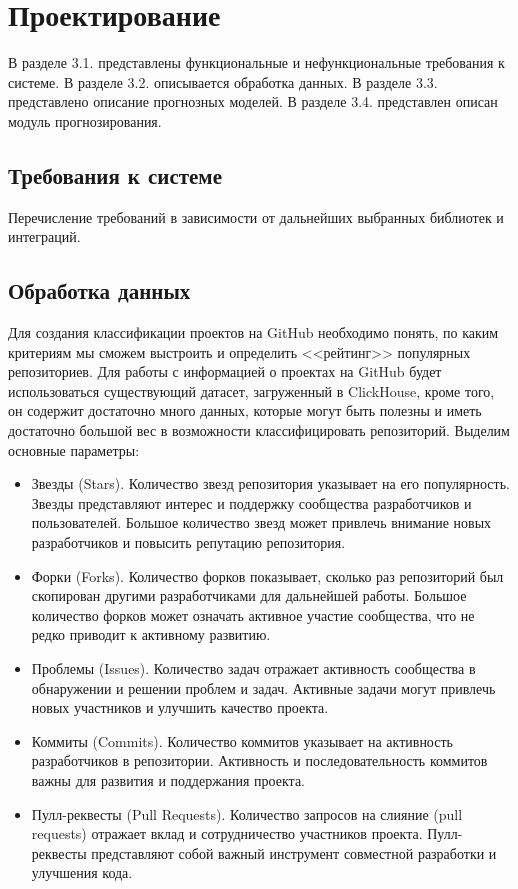 \lstset{language=C, frame=L, basicstyle=\footnotesize,%
	keywordstyle=\bfseries, showstringspaces=false, xleftmargin=\parindent, numbers=none, numberstyle=\tiny, stepnumber=2, numbersep=14pt}
\newpage
\section{Проектирование}
\label{sec:Design}

В разделе 3.1. представлены функциональные и нефункциональные требования к системе. В разделе 3.2. описывается обработка данных. В разделе 3.3. представлено описание прогнозных моделей. В разделе 3.4. представлен описан модуль прогнозирования.

\subsection{Требования к системе}

Перечисление требований в зависимости от дальнейших выбранных библиотек и интеграций.

\subsection{Обработка данных}

 Для создания классификации проектов на GitHub необходимо понять, по каким критериям мы сможем выстроить и определить <<рейтинг>> популярных репозиториев. Для работы с информацией о проектах на GitHub будет использоваться существующий датасет, загруженный в ClickHouse, кроме того, он содержит достаточно много данных, которые могут быть полезны и иметь достаточно большой вес в возможности классифицировать репозиторий. Выделим основные параметры:
 \begin{itemize}
     \item Звезды (Stars). Количество звезд  репозитория указывает на его популярность. Звезды представляют интерес и поддержку сообщества разработчиков и пользователей. Большое количество звезд может привлечь внимание новых разработчиков и повысить репутацию репозитория.
     \item Форки (Forks). Количество форков показывает, сколько раз репозиторий был скопирован другими разработчиками для дальнейшей работы. Большое количество форков может означать активное участие сообщества, что не редко приводит к активному развитию.
    \item Проблемы (Issues). Количество задач отражает активность сообщества в обнаружении и решении проблем и задач. Активные задачи могут привлечь новых участников и улучшить качество проекта.
    \item Коммиты (Commits). Количество коммитов указывает на активность разработчиков в репозитории. Активность и последовательность коммитов важны для развития и поддержания проекта.
    \item Пулл-реквесты (Pull Requests). Количество запросов на слияние (pull requests) отражает вклад и сотрудничество участников проекта. Пулл-реквесты представляют собой важный инструмент совместной разработки и улучшения кода.
 \end{itemize}

